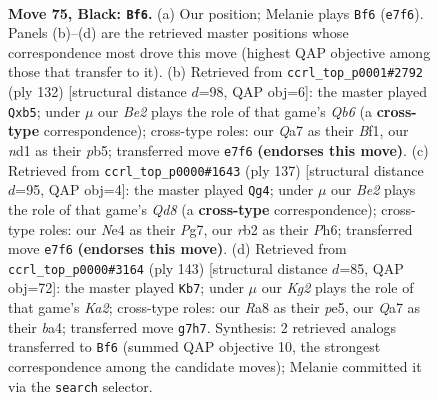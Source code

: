 \documentclass[11pt]{article}
\begin{document}
\clearpage

\begin{figure}[p]\centering
\begin{subfigure}{0.46\textwidth}\centering
\resizebox{\linewidth}{!}{%
\newchessgame
\chessboard[
  setfen={r7/q3b1k1/8/P1p1Qp2/3pnPp1/8/1R1BP3/3NK3 b - - 11 75},
  showmover=false,
  pgfstyle=straightmove, color=movearrow, markmove={e7-f6}
]}
\caption{}
\end{subfigure}\hfill
\begin{subfigure}{0.46\textwidth}\centering
\resizebox{\linewidth}{!}{%
\newchessgame
\chessboard[
  setfen={8/5bk1/1Q2n1p1/1p1pP3/3q4/3N1pP1/5P2/5BK1 w - - 2 67},
  showmover=false,
  pgfstyle=straightmove, color=movearrow, markmove={b6-b5}
]}
\caption{}
\end{subfigure}
\\[4pt]
\begin{subfigure}{0.46\textwidth}\centering
\resizebox{\linewidth}{!}{%
\newchessgame
\chessboard[
  setfen={8/5Qpk/4p2p/3pP3/3BnN1P/8/5PPK/3q1b2 b - - 0 69},
  showmover=false,
  pgfstyle=straightmove, color=movearrow, markmove={d1-g4}
]}
\caption{}
\end{subfigure}\hfill
\begin{subfigure}{0.46\textwidth}\centering
\resizebox{\linewidth}{!}{%
\newchessgame
\chessboard[
  setfen={8/k5p1/4p2p/2Q1Pp1P/BP2b3/2p1n3/5RPK/4q3 b - - 19 72},
  showmover=false,
  pgfstyle=straightmove, color=movearrow, markmove={a7-b7}
]}
\caption{}
\end{subfigure}
\caption{\textbf{Move 75, Black: \texttt{Bf6}.} (a) Our position; Melanie plays \texttt{Bf6} (\texttt{e7f6}). Panels (b)--(d) are the retrieved master positions whose correspondence most drove this move (highest QAP objective among those that transfer to it). (b) Retrieved from \texttt{ccrl\_top\_p0001\#2792} (ply 132) [structural distance $d$=98, QAP obj=6]: the master played \texttt{Qxb5}; under $\mu$ our \emph{Be2} plays the role of that game's \emph{Qb6} (a \textbf{cross-type} correspondence); cross-type roles: our \emph{Q}a7 as their \emph{B}f1, our \emph{n}d1 as their \emph{p}b5; transferred move \texttt{e7f6} \textbf{(endorses this move)}. (c) Retrieved from \texttt{ccrl\_top\_p0000\#1643} (ply 137) [structural distance $d$=95, QAP obj=4]: the master played \texttt{Qg4}; under $\mu$ our \emph{Be2} plays the role of that game's \emph{Qd8} (a \textbf{cross-type} correspondence); cross-type roles: our \emph{N}e4 as their \emph{P}g7, our \emph{r}b2 as their \emph{P}h6; transferred move \texttt{e7f6} \textbf{(endorses this move)}. (d) Retrieved from \texttt{ccrl\_top\_p0000\#3164} (ply 143) [structural distance $d$=85, QAP obj=72]: the master played \texttt{Kb7}; under $\mu$ our \emph{Kg2} plays the role of that game's \emph{Ka2}; cross-type roles: our \emph{R}a8 as their \emph{p}e5, our \emph{Q}a7 as their \emph{b}a4; transferred move \texttt{g7h7}. Synthesis: 2 retrieved analogs transferred to \texttt{Bf6} (summed QAP objective 10, the strongest correspondence among the candidate moves); Melanie committed it via the \texttt{search} selector.}
\label{fig:thought-m149}
\end{figure}
\end{document}
